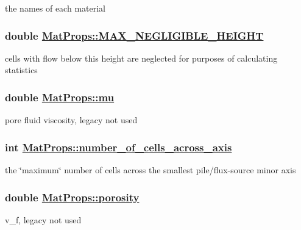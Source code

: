 the names of each material 

\hypertarget{structMatProps_o16}{
\subsubsection[MAX\_\-NEGLIGIBLE\_\-HEIGHT]{\setlength{\rightskip}{0pt plus 5cm}double \hyperlink{structMatProps_o16}{Mat\-Props::MAX\_\-NEGLIGIBLE\_\-HEIGHT}}}
\label{structMatProps_o16}


cells with flow below this height are neglected for purposes of calculating statistics 

\hypertarget{structMatProps_o9}{
\subsubsection[mu]{\setlength{\rightskip}{0pt plus 5cm}double \hyperlink{structMatProps_o9}{Mat\-Props::mu}}}
\label{structMatProps_o9}


pore fluid viscosity, legacy not used 

\hypertarget{structMatProps_o0}{
\subsubsection[number\_\-of\_\-cells\_\-across\_\-axis]{\setlength{\rightskip}{0pt plus 5cm}int \hyperlink{structMatProps_o0}{Mat\-Props::number\_\-of\_\-cells\_\-across\_\-axis}}}
\label{structMatProps_o0}


the \char`\"{}maximum\char`\"{} number of cells across the smallest pile/flux-source minor axis 

\hypertarget{structMatProps_o8}{
\subsubsection[porosity]{\setlength{\rightskip}{0pt plus 5cm}double \hyperlink{structMatProps_o8}{Mat\-Props::porosity}}}
\label{structMatProps_o8}


v\_\-f, legacy not used 

